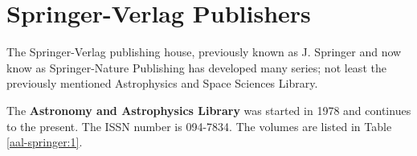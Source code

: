 \section{Springer-Verlag Publishers}

The Springer-Verlag publishing house, previously known as J. Springer
and now know as Springer-Nature Publishing has developed many series;
not least the previously mentioned Astrophysics and Space Sciences
Library.

The {\bf Astronomy and Astrophysics Library} was started in 1978 and
continues to the present. The ISSN number is 094-7834. The volumes are
listed in Table \ref{aal-springer:1}.
